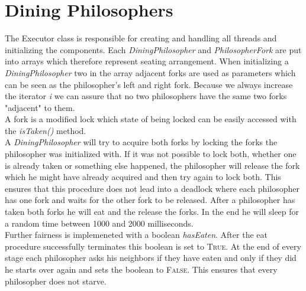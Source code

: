 \documentclass{article}
\begin{document}
    \section{Dining Philosophers}
    \begin{adjustwidth}{2em}{2em}
    	The Executor class is responsible for creating and handling all threads and initializing the components. Each \textit{DiningPhilosopher} and \textit{PhilosopherFork} are put into arrays which therefore represent seating arrangement. When initializing a \textit{DiningPhilosopher} two in the array adjacent forks are used as parameters which can be seen as the philosopher's left and right fork. Because we always increase the iterator \textit{i} we can assure that no two philosophers have the same two forks "adjacent" to them. \\
    	A fork is a modified lock which state of being locked can be easily accessed with the \textit{isTaken()} method. \\
    	A \textit{DiningPhilosopher} will try to acquire both forks by locking the forks the philosopher was initialized with. If it was not possible to lock both, whether one is already taken or something else happened, the philosopher will release the fork which he might have already acquired and then try again to lock both. This ensures that this procedure does not lead into a deadlock where each philosopher has one fork and waits for the other fork to be released. After a philosopher has taken both forks he will eat and the release the forks. In the end he will sleep for a random time between 1000 and 2000 milliseconds. \\
    	Further fairness is implemeneted with a boolean \textit{hasEaten}. After the eat procedure successfully terminates this boolean is set to \textsc{True}. At the end of every stage each philosopher asks his neighbors if they have eaten and only if they did he starts over again and sets the boolean to \textsc{False}. This ensures that every philosopher does not starve.
    \end{adjustwidth}
    
\end{document}
